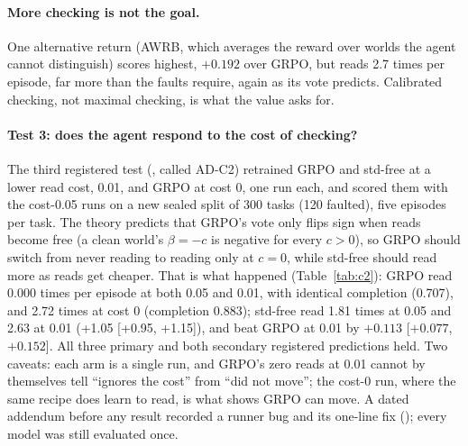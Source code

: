 \documentclass[11pt]{article}
\begin{document}
\paragraph{More checking is not the goal.} One alternative return (AWRB, which averages the reward over worlds the
agent cannot distinguish) scores highest, $+0.192$ over GRPO, but reads 2.7 times per episode, far more than the faults
require, again as its vote predicts. Calibrated checking, not maximal checking, is what the value asks for.

\paragraph{Test 3: does the agent respond to the cost of checking?} The third registered test
(, called AD-C2) retrained GRPO and std-free at a lower read cost, 0.01, and GRPO at
cost 0, one run each, and scored them with the cost-0.05 runs on a new sealed split of 300 tasks (120 faulted), five
episodes per task. The theory predicts that GRPO's vote only flips sign when reads become free (a clean world's
$\beta=-c$ is negative for every $c>0$), so GRPO should switch from never reading to reading only at $c=0$, while
std-free should read more as reads get cheaper. That is what happened (Table~\ref{tab:c2}): GRPO read 0.000 times per
episode at both 0.05 and 0.01, with identical completion (0.707), and 2.72 times at cost 0 (completion 0.883); std-free
read 1.81 times at 0.05 and 2.63 at 0.01 (+1.05 [+0.95, +1.15]), and beat GRPO at 0.01 by $+0.113$ [$+0.077$, $+0.152$].
All three primary and both secondary registered predictions held. Two caveats: each arm is a single run, and GRPO's
zero reads at 0.01 cannot by themselves tell ``ignores the cost'' from ``did not move''; the cost-0 run, where the same
recipe does learn to read, is what shows GRPO can move. A dated addendum before any result recorded a runner bug and
its one-line fix (); every model was still evaluated once.

\begin{table}[t]\centering\small
{}
\caption{Test 3 on the sealed split (300 tasks, 120 faulted; greedy decoding; one training run per arm). Source:
.}\label{tab:c2}
\end{table}
\end{document}
